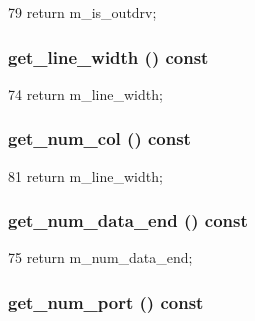 \begin{DoxyCode}
79 { return m_is_outdrv; }
\end{DoxyCode}
\hypertarget{classSRAM_a3331c2b6445f43552b749da69ea9a252}{
\subsubsection[{get\_\-line\_\-width}]{ get\_\-line\_\-width () const}}
\label{classSRAM_a3331c2b6445f43552b749da69ea9a252}



\begin{DoxyCode}
74 { return m_line_width; }
\end{DoxyCode}
\hypertarget{classSRAM_aeaeab0740a324ed17fdab95be3a01e27}{
\subsubsection[{get\_\-num\_\-col}]{ get\_\-num\_\-col () const}}
\label{classSRAM_aeaeab0740a324ed17fdab95be3a01e27}



\begin{DoxyCode}
81 { return m_line_width; }
\end{DoxyCode}
\hypertarget{classSRAM_a761fb745955331551770d0d323372db5}{
\subsubsection[{get\_\-num\_\-data\_\-end}]{ get\_\-num\_\-data\_\-end () const}}
\label{classSRAM_a761fb745955331551770d0d323372db5}



\begin{DoxyCode}
75 { return m_num_data_end; }
\end{DoxyCode}
\hypertarget{classSRAM_a19419ab4e6838e43d62657758e0821ff}{
\subsubsection[{get\_\-num\_\-port}]{ get\_\-num\_\-port () const}}
\label{classSRAM_a19419ab4e6838e43d62657758e0821ff}



